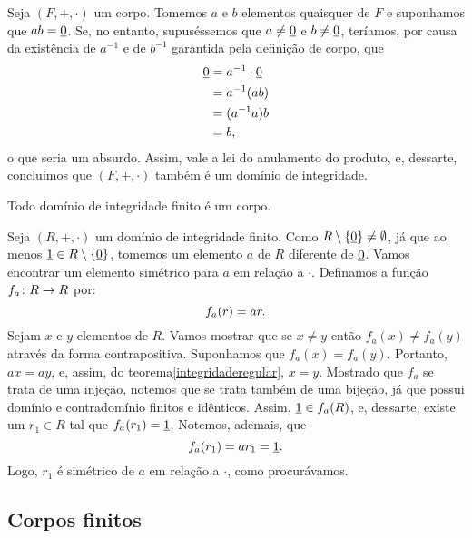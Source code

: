 \begin{dem}
  Seja $(F,+,\cdot)$ um corpo. Tomemos $a$ e $b$ elementos quaisquer de
  $F$ e suponhamos que $ab = \underline{0}$. Se, no entanto, supuséssemos que
  $a\neq\underline{0}$ e $b\neq\underline{0}$, teríamos, por causa da existência de
  $a^{-1}$ e de $b^{-1}$ garantida pela definição de corpo, que
  \begin{equation*}
    \begin{aligned}
      \underline{0} &= a^{-1}\cdot\underline{0}\\
            &= a^{-1}(ab) \\
            &= (a^{-1}a)b \\
            &= b\mathrm{,}
    \end{aligned}
  \end{equation*}
  o que seria um absurdo. Assim, vale a lei do anulamento do produto, e,
  dessarte, concluimos que $(F,+,\cdot)$ também é um domínio de
  integridade.
\end{dem}

\begin{Teo}\label{teodifinitocorpo}
  Todo domínio de integridade finito é um corpo.
\end{Teo}

\begin{dem}
  Seja $(R,+,\cdot)$ um domínio de integridade finito.
  Como $R\setminus\left\{ \underline{0} \right\}\neq\emptyset$, já que ao menos $\underline{1}\in
  R\setminus\left\{ \underline{0} \right\}$,
  tomemos um elemento $a$ de $R$ diferente
  de $\underline{0}$. Vamos encontrar um elemento simétrico para $a$ em relação
  a $\cdot$. Definamos a função $f_a\colon R\rightarrow R$ por:
  \begin{equation*}
    f_a(r) = ar\mathrm{.}
  \end{equation*}
  Sejam $x$ e $y$ elementos de $R$. Vamos mostrar que se $x\neq y$ então
  $f_a(x)\neq f_a(y)$ através da forma contrapositiva. Suponhamos que
  $f_a(x)=f_a(y)$. Portanto, $ax = ay$,
  e, assim, do teorema\xspace\ref{integridaderegular}, $x=y$. Mostrado
  que $f_a$ se trata de uma injeção,
  notemos que se trata também de uma bijeção, já que possui domínio e
  contradomínio finitos e idênticos. Assim, $\underline{1}\in f_a(R)$, e,
  dessarte, existe um $r_1\in R$ tal que $f_a(r_1)=\underline{1}$. Notemos,
  ademais,
  que
  \begin{equation*}
    f_a(r_1) = ar_1 = \underline{1}\mathrm{.}
  \end{equation*}
  Logo, $r_1$ é simétrico de $a$ em relação a $\cdot$, como
  procurávamos.
\end{dem}

\subsection{Corpos finitos}

